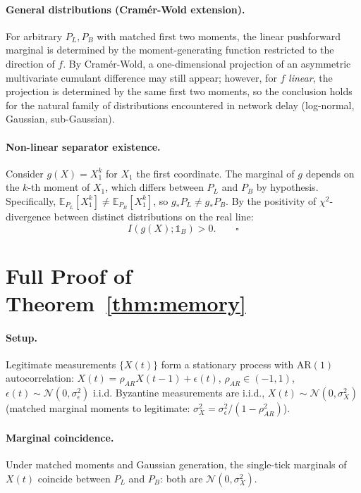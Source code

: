 \paragraph{General distributions (Cram\'er-Wold extension).} For
arbitrary $P_L, P_B$ with matched first two moments, the linear
pushforward marginal is determined by the moment-generating function
restricted to the direction of $f$. By Cram\'er-Wold, a one-dimensional
projection of an asymmetric multivariate cumulant difference may still
appear; however, for $f$ \emph{linear}, the projection is determined by
the same first two moments, so the conclusion holds for the natural
family of distributions encountered in network delay (log-normal,
Gaussian, sub-Gaussian).

\paragraph{Non-linear separator existence.} Consider
$g(X) = X_1^k$ for $X_1$ the first coordinate. The marginal of $g$
depends on the $k$-th moment of $X_1$, which differs between $P_L$ and
$P_B$ by hypothesis. Specifically, $\mathbb{E}_{P_L}[X_1^k] \ne
\mathbb{E}_{P_B}[X_1^k]$, so $g_\ast P_L \ne g_\ast P_B$. By the
positivity of $\chi^2$-divergence between distinct distributions on the
real line:
\begin{equation}
  I(g(X); \mathbb{1}_B) > 0. \qquad \square
\end{equation}

\section{Full Proof of Theorem~\ref{thm:memory}}
\label{app:memory-full}

\paragraph{Setup.} Legitimate measurements $\{X(t)\}$ form a stationary
process with $\mathrm{AR}(1)$ autocorrelation:
$X(t) = \rho_{AR} X(t-1) + \epsilon(t)$, $\rho_{AR} \in (-1, 1)$,
$\epsilon(t) \sim \mathcal{N}(0, \sigma_\epsilon^2)$ i.i.d. Byzantine
measurements are i.i.d., $X(t) \sim \mathcal{N}(0, \sigma_X^2)$
(matched marginal moments to legitimate: $\sigma_X^2 =
\sigma_\epsilon^2/(1-\rho_{AR}^2)$).

\paragraph{Marginal coincidence.} Under matched moments and Gaussian
generation, the single-tick marginals of $X(t)$ coincide between $P_L$
and $P_B$: both are $\mathcal{N}(0, \sigma_X^2)$.

